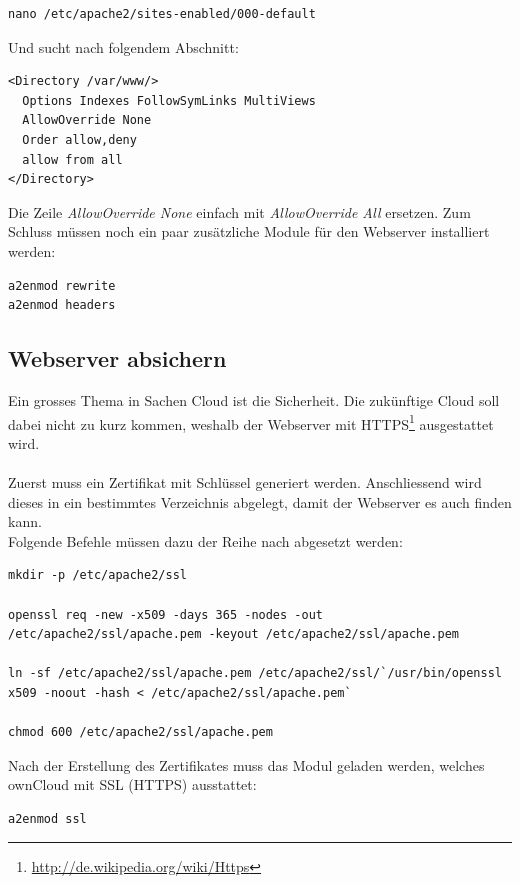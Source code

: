 \begin{lstlisting}
nano /etc/apache2/sites-enabled/000-default
\end{lstlisting}

Und sucht nach folgendem Abschnitt:

\begin{lstlisting}
<Directory /var/www/>
  Options Indexes FollowSymLinks MultiViews
  AllowOverride None
  Order allow,deny
  allow from all
</Directory>
\end{lstlisting}

Die Zeile \textit{AllowOverride None} einfach mit \textit{AllowOverride All} ersetzen. Zum Schluss müssen noch ein paar zusätzliche Module für den Webserver installiert werden:

\begin{lstlisting}
a2enmod rewrite
a2enmod headers
\end{lstlisting}

\subsection{Webserver absichern}
Ein grosses Thema in Sachen Cloud ist die Sicherheit. Die zukünftige Cloud soll dabei nicht zu kurz kommen, weshalb der Webserver mit HTTPS\footnote{\url{http://de.wikipedia.org/wiki/Https}}
ausgestattet wird.
\\
\\
Zuerst muss ein Zertifikat mit Schlüssel generiert werden. Anschliessend wird dieses in ein bestimmtes Verzeichnis abgelegt, damit der Webserver es auch finden kann.
\\
Folgende Befehle müssen dazu der Reihe nach abgesetzt werden:

\begin{lstlisting}
mkdir -p /etc/apache2/ssl

openssl req -new -x509 -days 365 -nodes -out /etc/apache2/ssl/apache.pem -keyout /etc/apache2/ssl/apache.pem

ln -sf /etc/apache2/ssl/apache.pem /etc/apache2/ssl/`/usr/bin/openssl x509 -noout -hash < /etc/apache2/ssl/apache.pem`

chmod 600 /etc/apache2/ssl/apache.pem
\end{lstlisting}

Nach der Erstellung des Zertifikates muss das Modul geladen werden, welches ownCloud mit SSL (HTTPS) ausstattet:

\begin{lstlisting}
a2enmod ssl
\end{lstlisting}

